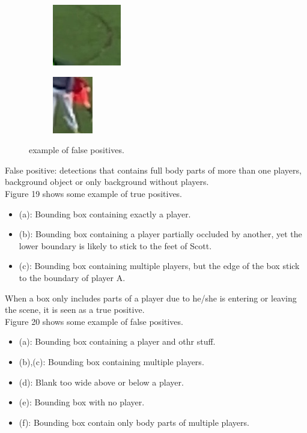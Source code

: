 \documentclass{article}
\begin{document}
\begin{figure}[h!]
\begin{subfigure}[b]{0.25\linewidth}
    \caption{}
  \end{subfigure}
  \begin{subfigure}[b]{0.25\linewidth}
  \centering
    \includegraphics[scale=0.4]{report/pic/4/neg_5.jpg} 
    \caption{}
  \end{subfigure}
  \begin{subfigure}[b]{0.25\linewidth}
  \centering
    \includegraphics[scale=0.4]{report/pic/4/neg_6.jpg} 
    \caption{}
  \end{subfigure}
  \caption{example of false positives.}
\end{figure}
False positive: detections that contains full body parts of more than one players, background object or only background without players. \\
Figure 19 shows some example of true positives.
\begin{itemize}
\item (a): Bounding box containing exactly a player.
\item (b): Bounding box containing a player partially occluded by another, yet the lower boundary is likely to stick to the feet of Scott.
\item (c): Bounding box containing multiple players, but the edge of the box stick to the boundary of player A.
\end{itemize}
When a box only includes parts of a player due to he/she is entering or leaving the scene, it is seen as a true positive.\\
Figure 20 shows some example of false positives.
\begin{itemize}
\item (a): Bounding box containing a player and othr stuff.
\item (b),(c): Bounding box containing multiple players. 
\item (d): Blank too wide above or below a player.
\item (e): Bounding box with no player.
\item (f): Bounding box contain only body parts of multiple players.
\end{itemize}
\end{document}
